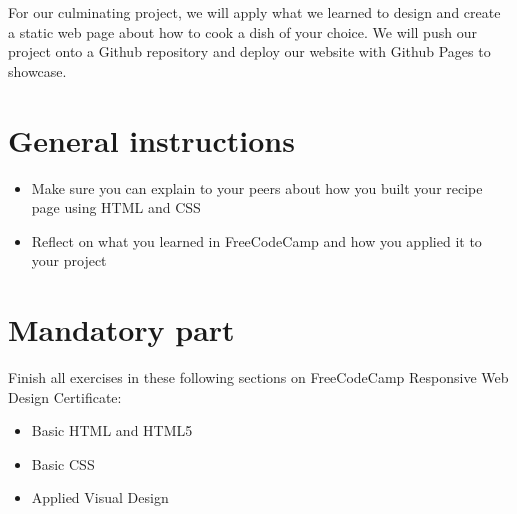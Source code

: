 \documentclass{42-en}
\begin{document}
For our culminating project, we will apply what we learned to design and create a static web page about how to cook a dish of your choice. We will push our project onto a Github repository and deploy our website with Github Pages to showcase.



\chapter{General instructions}

\begin{itemize}
    \item Make sure you can explain to your peers about how you built your recipe page using HTML and CSS
    \item Reflect on what you learned in FreeCodeCamp and how you applied it to your project
\end{itemize}
   
    



\chapter{Mandatory part}

Finish all exercises in these following sections on FreeCodeCamp Responsive Web Design Certificate:
\begin{itemize}
    \item Basic HTML and HTML5
    \item Basic CSS
    \item Applied Visual Design
\end{itemize}
\vspace{0.2in}
\end{document}
